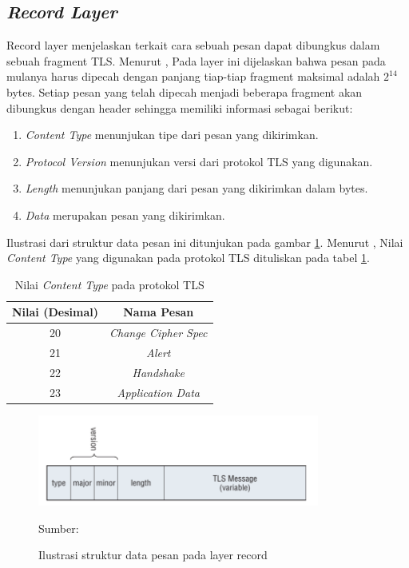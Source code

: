 \subsection{\emph{Record Layer}}
Record layer menjelaskan terkait cara sebuah pesan dapat dibungkus dalam sebuah fragment TLS. Menurut \textcite{rfc5246}, Pada layer ini dijelaskan bahwa pesan pada mulanya harus dipecah dengan panjang tiap-tiap fragment maksimal adalah $2^14$ bytes. Setiap pesan yang telah dipecah menjadi beberapa fragment akan dibungkus dengan header sehingga memiliki informasi sebagai berikut:

\begin{enumerate}
  \item \emph{Content Type} menunjukan tipe dari pesan yang dikirimkan.
  \item \emph{Protocol Version} menunjukan versi dari protokol TLS yang digunakan.
  \item \emph{Length} menunjukan panjang dari pesan yang dikirimkan dalam bytes.
  \item \emph{Data} merupakan pesan yang dikirimkan.
\end{enumerate}

Ilustrasi dari struktur data pesan ini ditunjukan pada gambar \ref{fig:tls.record}. Menurut \textcite{rfc5246}, Nilai \emph{Content Type} yang digunakan pada protokol TLS dituliskan pada tabel \ref{tab:tls.contenttype}.

\begin{table}[!h]
  \centering
  \caption{Nilai \emph{Content Type} pada protokol TLS} \label{tab:tls.contenttype}
  \begin{tabular}{|c|c|}
    \hline
    \textbf{Nilai (Desimal)} & \textbf{Nama Pesan} \\
    \hline
    20 & \emph{Change Cipher Spec} \\ \hline
    21 & \emph{Alert} \\ \hline
    22 & \emph{Handshake} \\ \hline
    23 & \emph{Application Data} \\
    \hline
  \end{tabular}
\end{table}

\begin{figure}[!h]
  \centering
  \includegraphics[width=350px]{chapters/res/chapter-2/img/tls.record.png}
  \caption{Ilustrasi struktur data pesan pada layer record} \label{fig:tls.record}
  Sumber: \textcite{joshua2011}
\end{figure}

